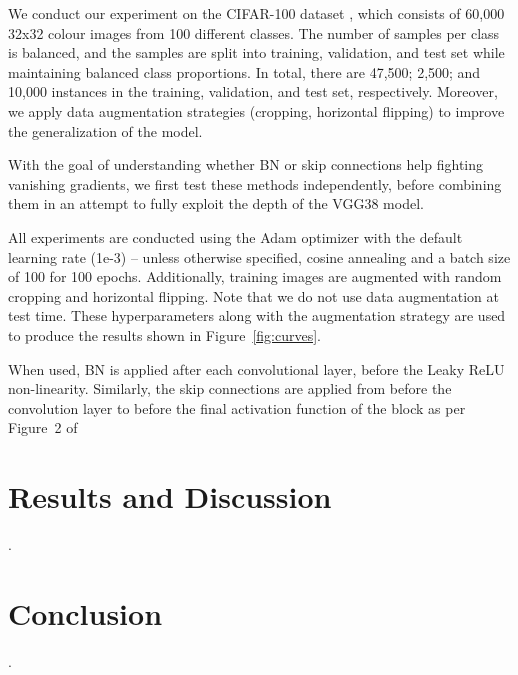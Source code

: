 \documentclass{article}
\begin{document}
\questionFigureFour

\questionFigureFive

\questionTableOne

We conduct our experiment on the CIFAR-100 dataset \cite{krizhevsky2009learning},
which consists of 60,000 32x32 colour images from
100 different classes. The number of samples per class is balanced, and the
samples are split into training, validation, and test set while
maintaining balanced class proportions. In total, there are
47,500; 2,500; and 10,000 instances in the training, validation,
and test set, respectively. Moreover, we apply data
augmentation strategies (cropping, horizontal flipping) to
improve the generalization of the model.

With the goal of understanding whether BN or skip connections
help fighting vanishing gradients, we first test these
methods independently, before combining them in an attempt
to fully exploit the depth of the VGG38 model.

All experiments are conducted using the Adam optimizer with the default
learning rate (1e-3) -- unless otherwise specified, cosine annealing and a batch size of 100
for 100 epochs. 
Additionally, training images are augmented with random 
cropping and horizontal flipping.
Note that we do not use data augmentation at test time.
These hyperparameters along with the augmentation strategy are used
to produce the results shown in Figure~\ref{fig:curves}.

When used, BN is applied
after each convolutional layer, before the Leaky
ReLU non-linearity. Similarly, the skip connections are applied from 
before the convolution layer to before the final activation function
of the block as per Figure~2 of \cite{he2016deep} 





\section{Results and Discussion}
\label{sec:disc}

\questionFour.

\section{Conclusion}
\label{sec:concl}
    
\questionFive.


\end{document}
